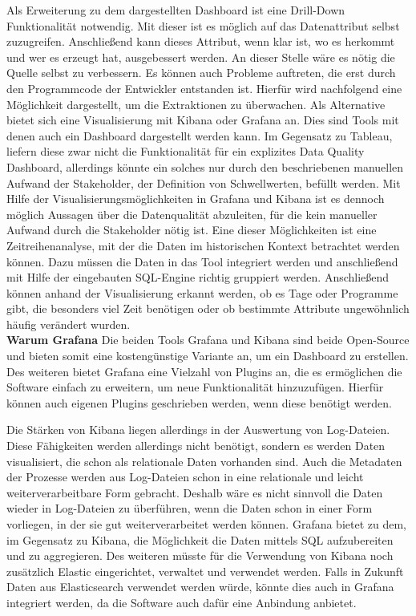 Als Erweiterung zu dem dargestellten Dashboard ist eine Drill-Down Funktionalität notwendig.
Mit dieser ist es möglich auf das Datenattribut selbst zuzugreifen. 
Anschließend kann dieses Attribut, wenn klar ist, wo es herkommt und wer es erzeugt hat, ausgebessert werden.
An dieser Stelle wäre es nötig die Quelle selbst zu verbessern. %
Es können auch Probleme auftreten, die erst durch den Programmcode der Entwickler entstanden ist.
Hierfür wird nachfolgend eine Möglichkeit dargestellt, um die Extraktionen zu überwachen.
% 
Als Alternative bietet sich eine Visualisierung mit Kibana oder Grafana an.
Dies sind Tools mit denen auch ein Dashboard dargestellt werden kann.
Im Gegensatz zu Tableau, liefern diese zwar nicht die Funktionalität für ein explizites Data Quality Dashboard, allerdings könnte ein solches nur durch den beschriebenen manuellen Aufwand der Stakeholder, der Definition von Schwellwerten, befüllt werden.
Mit Hilfe der Visualisierungsmöglichkeiten in Grafana und Kibana ist es dennoch möglich Aussagen über die Datenqualität abzuleiten, für die kein manueller Aufwand durch die Stakeholder nötig ist.
Eine dieser Möglichkeiten ist eine Zeitreihenanalyse, mit der die Daten im historischen Kontext betrachtet werden können.
Dazu müssen die Daten in das Tool integriert werden und anschließend mit Hilfe der eingebauten SQL-Engine richtig gruppiert werden.
Anschließend können anhand der Visualisierung erkannt werden, ob es Tage oder Programme gibt, die besonders viel Zeit benötigen oder ob bestimmte Attribute ungewöhnlich häufig verändert wurden. \\

\textbf{Warum Grafana}
Die beiden Tools Grafana und Kibana sind beide Open-Source und bieten somit eine kostengünstige Variante an, um ein Dashboard zu erstellen. 
Des weiteren bietet Grafana eine Vielzahl von Plugins an, die es ermöglichen die Software einfach zu erweitern, um neue Funktionalität hinzuzufügen. 
Hierfür können auch eigenen Plugins geschrieben werden, wenn diese benötigt werden.

Die Stärken von Kibana liegen allerdings in der Auswertung von Log-Dateien.
Diese Fähigkeiten werden allerdings nicht benötigt, sondern es werden Daten visualisiert, die schon als relationale Daten vorhanden sind. 
Auch die Metadaten der Prozesse werden aus Log-Dateien schon in eine relationale und leicht weiterverarbeitbare Form gebracht. 
Deshalb wäre es nicht sinnvoll die Daten wieder in Log-Dateien zu überführen, wenn die Daten schon in einer Form vorliegen, in der sie gut weiterverarbeitet werden können. 
Grafana bietet zu dem, im Gegensatz zu Kibana, die Möglichkeit die Daten mittels SQL aufzubereiten und zu aggregieren. 
Des weiteren müsste für die Verwendung von Kibana noch zusätzlich Elastic eingerichtet, verwaltet und verwendet werden. 
Falls in Zukunft Daten aus Elasticsearch verwendet werden würde, könnte dies auch in Grafana integriert werden, da die Software auch dafür eine Anbindung anbietet. 

